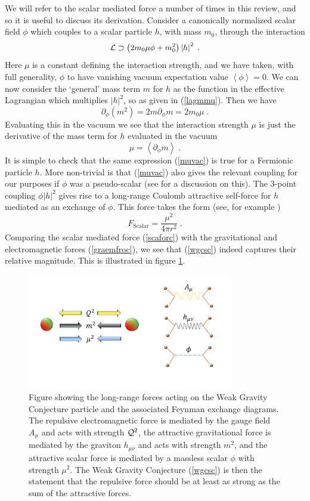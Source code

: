 \documentclass[11pt,a4paper]{article}
\numberwithin{equation}{section}
\numberwithin{table}{section}\setlength{\multlinegap}{25pt}
\newcommand{\be}{\begin{equation}}
\newcommand{\ee}{\end{equation}}
\begin{document}
We will refer to the scalar mediated force a number of times in this review, and so it is useful to discuss its derivation. Consider a canonically normalized scalar field $\phi$ which couples to a scalar particle $h$, with mass $m_0$, through the interaction
\be
\label{lagmmu}
{\cal L} \supset \left( 2 m_0 \mu \phi + m_0^2 \right)\left| h \right|^2 \;.
\ee
Here $\mu$ is a constant defining the interaction strength, and we have taken, with full generality, $\phi$ to have vanishing vacuum expectation value $\left< \phi\right>=0$. We can now consider the `general' mass term $m$ for $h$ as the function in the effective Lagrangian which multiplies $\left|h\right|^2$, so as given in (\ref{lagmmu}). Then we have
\be
\partial_{\phi} \left( m^2 \right) = 2 m \partial_{\phi} m = 2 m_0 \mu\;.
\ee
Evaluating this in the vacuum we see that the interaction strength $\mu$ is just the derivative of the mass term for $h$ evaluated in the vacuum
\be
\label{muvac}
\mu = \left< \partial_{\phi} m \right> \;.
\ee
It is simple to check that the same expression (\ref{muvac}) is true for a Fermionic particle $h$. More non-trivial is that (\ref{muvac}) also gives the relevant coupling for our purposes if $\phi$ was a pseudo-scalar (see \cite{Lust:2017wrl} for a discussion on this). The 3-point coupling $\phi \left|h\right|^2$ gives rise to a long-range Coulomb attractive self-force for $h$ mediated as an exchange of $\phi$. This force takes the form (see, for example \cite{TongQFT})
\be
\label{scaforc}
F_{\mathrm{Scalar}} = \frac{\mu^2}{4 \pi r^2} \;.
\ee 
Comparing the scalar mediated force (\ref{scaforc}) with the gravitational and electromagnetic forces (\ref{graemfroc}), we see that (\ref{wgcsc}) indeed captures their relative magnitude. This is illustrated in figure \ref{fig:WGCSCF}.
\begin{figure}[t]
\centering
 \includegraphics[width=0.8\textwidth]{figWGCSCF.pdf}
\caption{Figure showing the long-range forces acting on the Weak Gravity Conjecture particle and the associated Feynman exchange diagrams. The repulsive electromagnetic force is mediated by the gauge field $A_{\mu}$ and acts with strength ${\cal Q}^2$, the attractive gravitational force is mediated by the graviton $h_{\mu\nu}$ and acts with strength $m^2$, and the attractive scalar force is mediated by a massless scalar $\phi$ with strength $\mu^2$. The Weak Gravity Conjecture (\ref{wgcsc}) is then the statement that the repulsive force should be at least as strong as the sum of the attractive forces.}
\label{fig:WGCSCF}
\end{figure}
\end{document}
